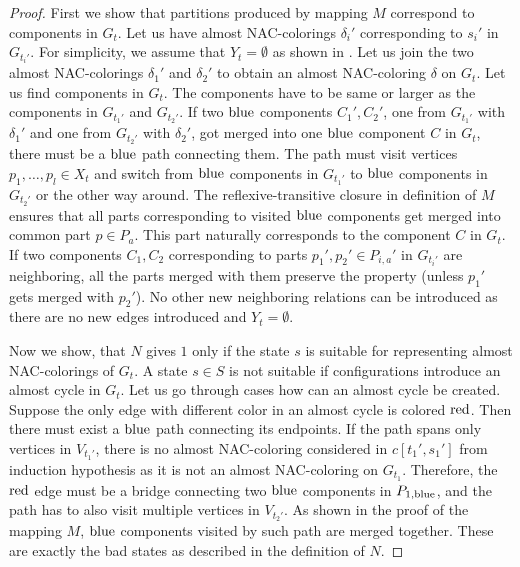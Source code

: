 \begin{proof}
	First we show that partitions produced by mapping \( M \)
	correspond to components in \( G_t \).
	Let us have almost NAC-colorings \( \delta_i' \) corresponding
	to \( s_i' \) in \( G_{t_i'} \).
	For simplicity, we assume that \( Y_t = \emptyset \)
	as shown in .
	Let us join the two almost NAC-colorings \( \delta_1' \) and \( \delta_2' \)
	to obtain an almost NAC-coloring \( \delta \) on \( G_t \).
	Let us find components in \( G_t \).
	The components have to be same or larger as the components
	in \( G_{t_1'} \) and \( G_{t_2'} \).
	If two \( \text{blue} \) components \( C_1', C_2' \),
	one from \( G_{t_1'} \) with \( \delta_1' \) and one from \( G_{t_2'} \) with \( \delta_2' \),
	got merged into one \( \text{blue} \) component \( C \) in \( G_t \),
	there must be a \( \text{blue} \) path connecting them.
	The path must visit vertices \( p_1, \dots, p_l \in X_t \)
	and switch from \( \text{blue} \) components in \( G_{t_1'} \)
	to \( \text{blue} \) components in \( G_{t_2'} \) or the other way around.
	The reflexive-transitive closure in definition of \( M \) ensures that
	all parts corresponding to visited \( \text{blue} \) components
	get merged into common part \( p \in P_a \).
	This part naturally corresponds to the component \( C \) in \( G_t \).
	If two components \( C_1, C_2 \) corresponding to
	parts \( p_1', p_2' \in P_{i,a}' \) in \( G_{t_i'} \) are neighboring,
	all the parts merged with them preserve the property
	(unless \( p_1' \) gets merged with \( p_2' \)).
	No other new neighboring relations can be introduced
	as there are no new edges introduced and \( Y_t = \emptyset \).

	Now we show, that \( N \) gives \( 1 \) only if the state \( s \)
	is suitable for representing almost NAC-colorings of \( G_t \).
	A state \( s \in S \) is not suitable if configurations
	introduce an almost cycle in \( G_t \).
	Let us go through cases how can an almost cycle be created.
	Suppose the only edge with different color in an almost cycle is colored \( \text{red} \).
	Then there must exist a \( \text{blue} \) path connecting its endpoints.
	If the path spans only vertices
	in \( V_{t_1'} \), there is no almost NAC-coloring considered in \( c[t_1', s_1'] \)
	from induction hypothesis as it is not an almost NAC-coloring on \( G_{t_1} \).
	Therefore, the \( \text{red} \) edge must be
	a bridge connecting two \( \text{blue} \) components in \( P_{1,\text{blue}} \),
	and the path has to also visit multiple vertices in \( V_{t_2'} \).
	As shown in the proof of the mapping \( M \), \( \text{blue} \) components
	visited by such path are merged together.
	These are exactly the bad states as described in the definition of \( N \).
\end{proof}
%

